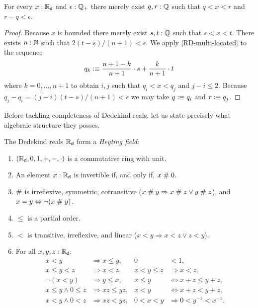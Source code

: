\begin{thm} \label{RD-archimedean}
  For every $x : \mathbb{R}_\mathsf{d}$ and $\epsilon : \mathbb{Q}_{+}$ there merely exist $q, r : \mathbb{Q}$ such that $q < x
  < r$ and $r - q < \epsilon$.
\end{thm}

\begin{proof}
  Because $x$ is bounded there merely exist $s, t : \mathbb{Q}$ such that $s < x < t$. There
  exists $n : \mathbb{N}$ such that $2 (t - s)/(n + 1) < \epsilon$. We apply
  \autoref{RD-multi-located} to the sequence
  \begin{equation*}
    q_k \vcentcolon\equiv \frac{n + 1 - k}{n+1} \cdot s + \frac{k}{n+1} \cdot t
  \end{equation*}
  where $k = 0, \ldots, n+1$ to obtain $i, j$ such that $q_i < x < q_j$ and $j - i \leq
  2$. Because $q_j - q_i = (j - i) (t - s)/(n + 1) < \epsilon$ we may take $q \vcentcolon\equiv q_i$
  and $r \vcentcolon\equiv q_j$.
\end{proof}

Before tackling completeness of Dedekind reals, let us state precisely what algebraic
structure they posses.

\begin{thm} \label{RD-Heyting-field} The Dedekind reals $\mathbb{R}_\mathsf{d}$ form a \emph{Heyting field}:
  \begin{enumerate}
  \item $(\mathbb{R}_\mathsf{d}, 0, 1, {+}, {-}, {\cdot})$ is a commutative ring with unit.
  \item An element $x : \mathbb{R}_\mathsf{d}$ is invertible if, and only if, $x \mathrel{\#} 0$.
  \item $\mathrel{\#}$ is irreflexive, symmetric, cotransitive ($x \mathrel{\#} y \Rightarrow x
    \mathrel{\#} z \lor y \mathrel{\#} z$), and $x = y \Leftrightarrow \lnot (x \mathrel{\#} y)$.
  \item $\leq$ is a partial order.
  \item $<$ is transitive, irreflexive, and linear ($x < y \Rightarrow x < z \lor z < y$).
  \item For all $x, y, z : \mathbb{R}_\mathsf{d}$:
    \begin{align*}
      x < y &\Rightarrow x \leq y, &
      0 &< 1, \\
      x \leq y < z &\Rightarrow x < z, &
      x < y \leq z &\Rightarrow x < z, \\
      \lnot (x < y) &\Rightarrow y \leq x, &
      x \leq y &\Leftrightarrow x + z \leq y + z, \\
      x \leq y \land 0 \leq z &\Rightarrow x z \leq y z,&
      x < y &\Leftrightarrow x + z < y + z, \\
      x < y \land 0 < z &\Rightarrow x z < y z, &
      0 < x < y &\Rightarrow 0 < y^{-1} < x^{-1}.
    \end{align*}
  \end{enumerate}  
\end{thm}


